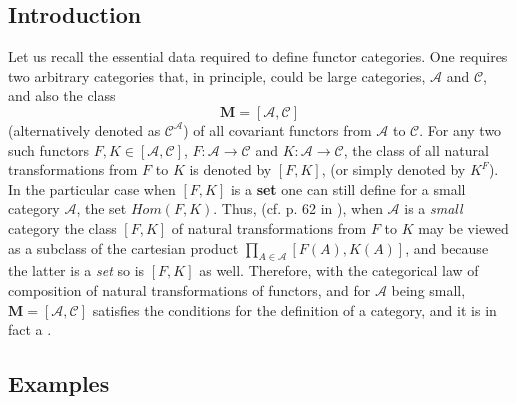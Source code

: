 \documentclass[12pt]{article}
\theoremstyle{plain}
\theoremstyle{definition}
\numberwithin{equation}{section}
\newcommand{\A}{\mathcal A}
\begin{document}
\subsection{Introduction}

 Let us recall the essential data required to define functor categories. One requires two arbitrary categories that, in principle, could be large categories, $\mathcal{\A}$ and $\mathcal{C}$, and also the class 
$$\textbf{M} = [\mathcal{\A},\mathcal{C}]$$ 
(alternatively denoted as $\mathcal{C}^{\mathcal{\A}}$) of all covariant functors from $\mathcal{\A}$ to $\mathcal{C}$. For any two such functors $F, K \in [\mathcal{\A}, \mathcal{C}]$, $ F: \mathcal{\A} \rightarrow \mathcal{C}$ and $ K: \mathcal{\A} \rightarrow \mathcal{C}$, the class of all natural transformations from $F$ to $K$ is denoted by $[F, K]$, (or simply denoted by $K^F$). In the particular case when $[F,K]$ is a \textbf{set} one can still define for a small category $\mathcal{\A}$, the set $Hom(F,K)$. Thus, (cf. p. 62 in \cite{Mitchell65}), when $\mathcal{\A}$ is a {\em small} category the class  $[F, K]$ of natural transformations from $F$ to $K$ may be viewed as a subclass of the cartesian product $\prod_{A \in \mathcal{\A}}[F(A), K(A)]$, and because the latter is a {\em set} so is $[F, K]$ as well.  Therefore, with the categorical law of composition of natural transformations of functors, and for $\mathcal{\A}$ being small, $\textbf{M} = [\mathcal{\A},\mathcal{C}]$ satisfies the conditions for the definition of a category, and it is in fact a . 
 

\subsection{Examples}
\end{document}
